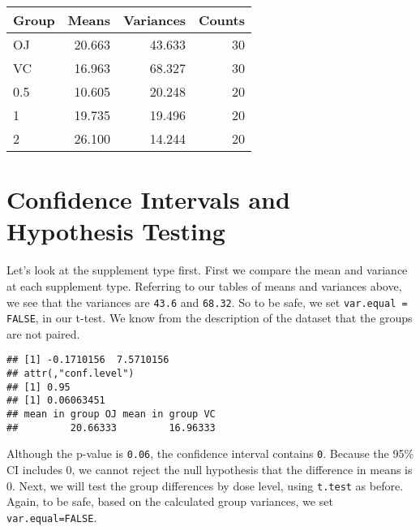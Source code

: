 \documentclass[]{article}
\newenvironment{Shaded}{\begin{snugshade}}{\end{snugshade}}
\newcommand{\KeywordTok}[1]{\textcolor[rgb]{0.13,0.29,0.53}{\textbf{{#1}}}}
\newcommand{\DataTypeTok}[1]{\textcolor[rgb]{0.13,0.29,0.53}{{#1}}}
\newcommand{\StringTok}[1]{\textcolor[rgb]{0.31,0.60,0.02}{{#1}}}
\newcommand{\OtherTok}[1]{\textcolor[rgb]{0.56,0.35,0.01}{{#1}}}
\newcommand{\NormalTok}[1]{{#1}}
\begin{document}
\begin{table}[ht]
\centering
\begin{tabular}{lrrr}
  \hline
Group & Means & Variances & Counts \\ 
  \hline
OJ & 20.663 & 43.633 &   30 \\ 
  VC & 16.963 & 68.327 &   30 \\ 
  0.5 & 10.605 & 20.248 &   20 \\ 
  1 & 19.735 & 19.496 &   20 \\ 
  2 & 26.100 & 14.244 &   20 \\ 
   \hline
\end{tabular}
\end{table}

\section{Confidence Intervals and Hypothesis
Testing}\label{confidence-intervals-and-hypothesis-testing}

Let's look at the supplement type first. First we compare the mean and
variance at each supplement type. Referring to our tables of means and
variances above, we see that the variances are \texttt{43.6} and
\texttt{68.32}. So to be safe, we set \texttt{var.equal = FALSE}, in our
t-test. We know from the description of the dataset that the groups are
not paired.

\begin{Shaded}
\end{Shaded}

\begin{verbatim}
## [1] -0.1710156  7.5710156
## attr(,"conf.level")
## [1] 0.95
## [1] 0.06063451
## mean in group OJ mean in group VC 
##         20.66333         16.96333
\end{verbatim}

Although the p-value is \texttt{0.06}, the confidence interval contains
\texttt{0}. Because the 95\% CI includes 0, we cannot reject the null
hypothesis that the difference in means is 0. Next, we will test the
group differences by dose level, using \texttt{t.test} as before. Again,
to be safe, based on the calculated group variances, we set
\texttt{var.equal=FALSE}.
\end{document}
